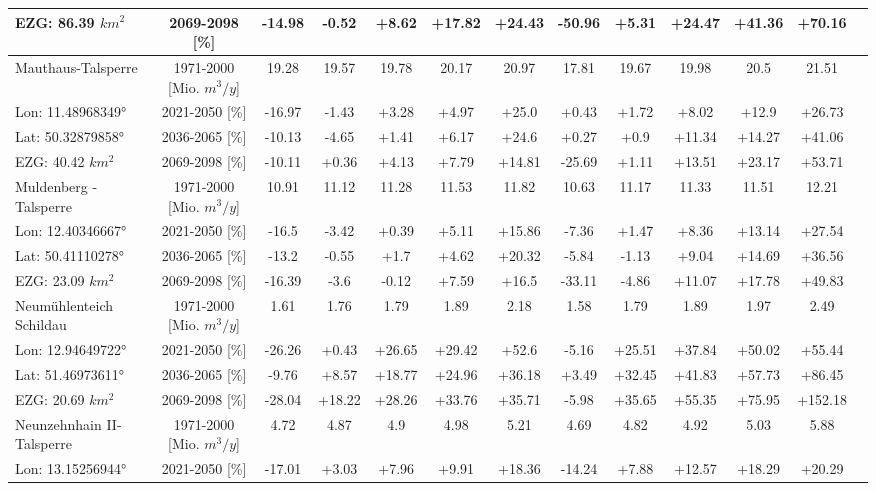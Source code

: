 \begin{longtable}{@{\extracolsep{\fill}}lc|ccccc||cccccc}
EZG: 86.39 $km^2$ & 2069-2098 [\%]  & -14.98 & -0.52 & +8.62 & +17.82 & +24.43 & -50.96 & +5.31 & +24.47 & +41.36 & +70.16 & \\ 
\hline 
Mauthaus-Talsperre & 1971-2000 [Mio. $m^3/y$]  & 19.28 & 19.57 & 19.78 & 20.17 & 20.97 & 17.81 & 19.67 & 19.98 & 20.5 & 21.51 & \\ 
\cline{2-13} 
Lon: 11.48968349° & 2021-2050 [\%]  & -16.97 & -1.43 & +3.28 & +4.97 & +25.0 & +0.43 & +1.72 & +8.02 & +12.9 & +26.73 & \\ 
Lat: 50.32879858° & 2036-2065 [\%]  & -10.13 & -4.65 & +1.41 & +6.17 & +24.6 & +0.27 & +0.9 & +11.34 & +14.27 & +41.06 & \\ 
EZG: 40.42 $km^2$ & 2069-2098 [\%]  & -10.11 & +0.36 & +4.13 & +7.79 & +14.81 & -25.69 & +1.11 & +13.51 & +23.17 & +53.71 & \\ 
\hline 
Muldenberg -Talsperre & 1971-2000 [Mio. $m^3/y$]  & 10.91 & 11.12 & 11.28 & 11.53 & 11.82 & 10.63 & 11.17 & 11.33 & 11.51 & 12.21 & \\ 
\cline{2-13} 
Lon: 12.40346667° & 2021-2050 [\%]  & -16.5 & -3.42 & +0.39 & +5.11 & +15.86 & -7.36 & +1.47 & +8.36 & +13.14 & +27.54 & \\ 
Lat: 50.41110278° & 2036-2065 [\%]  & -13.2 & -0.55 & +1.7 & +4.62 & +20.32 & -5.84 & -1.13 & +9.04 & +14.69 & +36.56 & \\ 
EZG: 23.09 $km^2$ & 2069-2098 [\%]  & -16.39 & -3.6 & -0.12 & +7.59 & +16.5 & -33.11 & -4.86 & +11.07 & +17.78 & +49.83 & \\ 
\hline 
Neumühlenteich Schildau & 1971-2000 [Mio. $m^3/y$]  & 1.61 & 1.76 & 1.79 & 1.89 & 2.18 & 1.58 & 1.79 & 1.89 & 1.97 & 2.49 & \\ 
\cline{2-13} 
Lon: 12.94649722° & 2021-2050 [\%]  & -26.26 & +0.43 & +26.65 & +29.42 & +52.6 & -5.16 & +25.51 & +37.84 & +50.02 & +55.44 & \\ 
Lat: 51.46973611° & 2036-2065 [\%]  & -9.76 & +8.57 & +18.77 & +24.96 & +36.18 & +3.49 & +32.45 & +41.83 & +57.73 & +86.45 & \\ 
EZG: 20.69 $km^2$ & 2069-2098 [\%]  & -28.04 & +18.22 & +28.26 & +33.76 & +35.71 & -5.98 & +35.65 & +55.35 & +75.95 & +152.18 & \\ 
\hline 
Neunzehnhain II-Talsperre & 1971-2000 [Mio. $m^3/y$]  & 4.72 & 4.87 & 4.9 & 4.98 & 5.21 & 4.69 & 4.82 & 4.92 & 5.03 & 5.88 & \\ 
\cline{2-13} 
Lon: 13.15256944° & 2021-2050 [\%]  & -17.01 & +3.03 & +7.96 & +9.91 & +18.36 & -14.24 & +7.88 & +12.57 & +18.29 & +20.29 & \\ 

\end{longtable}
